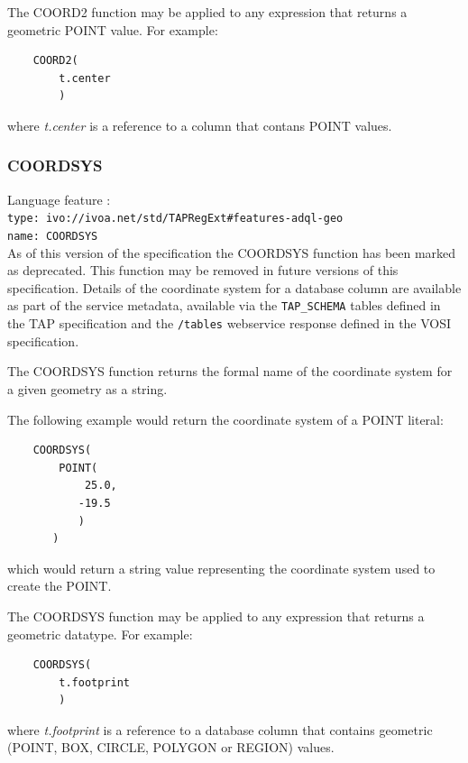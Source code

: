 \documentclass[11pt,a4paper]{ivoa}
\newcommand{\TAPspec}{TAP specification\xspace}
\newcommand{\VOSIspec}{VOSI specification\xspace}
\newcommand{\SectionRef}[1]{Section \ref{#1}\xspace}
\begin{document}
The COORD2 function may be applied to any expression that returns a
geometric POINT value.
For example:
\begin{verbatim}
    COORD2(
        t.center
        )
\end{verbatim}
\noindent
where \textit{t.center} is a reference to a column that contans POINT values.

\subsubsection{COORDSYS}
\label{sec:functions.geom.coordsys}
{\footnotesize Language feature :}\\
{\footnotesize \verb|type: ivo://ivoa.net/std/TAPRegExt#features-adql-geo|}\\
{\footnotesize \verb|name: COORDSYS|}\\

As of this version of the specification the COORDSYS function has
been marked as deprecated. This function may be removed in future versions
of this specification.
Details of the coordinate system for a database column are available as part of
the service metadata, available via the \verb:TAP_SCHEMA: tables defined in the
\TAPspec and the \verb:/tables: webservice response defined in the \VOSIspec.


The COORDSYS function returns the formal name of the coordinate system for
a given geometry as a string.

The following example would return the coordinate system of a POINT literal:
\begin{verbatim}
    COORDSYS(
        POINT(
            25.0,
           -19.5
           )
       )
\end{verbatim}
\noindent
which would return a string value representing the coordinate system used
to create the POINT.

The COORDSYS function may be applied to any expression that returns a
geometric datatype. For example:
\begin{verbatim}
    COORDSYS(
        t.footprint
        )
\end{verbatim}
\noindent
where \textit{t.footprint} is a reference to a database column that
contains geometric (POINT, BOX, CIRCLE, POLYGON or REGION) values.
\end{document}
